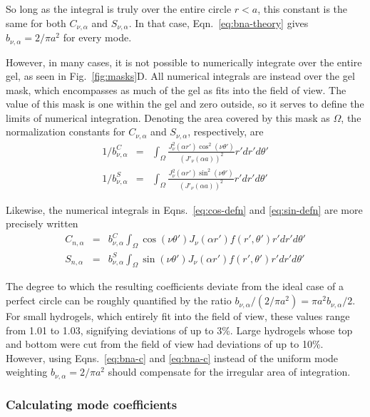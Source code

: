 So long as the integral is truly over the entire circle $r<a$, this constant is the same for both $C_{\nu,\alpha}$ and $S_{\nu,\alpha}$.  In that case, Eqn.~\ref{eq:bna-theory} gives $b_{\nu,\alpha} = 2/\pi a^2$ for every mode.

However, in many cases, it is not possible to numerically integrate over the entire gel, as seen in Fig.~\ref{fig:masks}D.  All numerical integrals are instead over the gel mask, which encompasses as much of the gel as fits into the field of view.  The value of this mask is one within the gel and zero outside, so it serves to define the limits of numerical integration.  Denoting the area covered by this mask as $\Omega$, the normalization constants for $C_{\nu,\alpha}$ and $S_{\nu,\alpha}$, respectively, are
\begin{eqnarray}
1/b_{\nu,\alpha}^C  &= & \int_\Omega \frac{ J_\nu^2(\alpha r')\cos^2(\nu\theta') }{\left(J'_\nu (\alpha a)\right)^2} r' dr' d\theta' \label{eq:bna-c} \\
1/b_{\nu,\alpha}^S  &=  &\int_\Omega \frac{ J_\nu^2(\alpha r')\sin^2(\nu\theta') }{\left(J'_\nu (\alpha a)\right)^2} r' dr' d\theta' \label{eq:bna-s}
\end{eqnarray}

Likewise, the numerical integrals in Eqns.~\ref{eq:cos-defn} and \ref{eq:sin-defn} are more precisely written 
\begin{eqnarray}
C_{n,\alpha} & = &b_{\nu,\alpha}^C \int_\Omega \cos\left(\nu\theta'\right) J_\nu(\alpha r')f(r',\theta') r' dr' d\theta' \label{eq:cos-defn2}\\
S_{n,\alpha} & = & b_{\nu,\alpha}^S\int_\Omega \sin\left(\nu\theta'\right) J_\nu(\alpha r') f(r',\theta') r' dr' d\theta' \label{eq:sin-defn2}
\end{eqnarray}

The degree to which the resulting coefficients deviate from the ideal case of a perfect circle can be roughly quantified by the ratio $b_{\nu,\alpha} /(2/\pi a^2) = \pi a^2 b_{\nu,\alpha} /2$. For small hydrogels, which entirely fit into the field of view, these values range from 1.01 to 1.03, signifying deviations of up to 3\%.  Large hydrogels whose top and bottom were cut from the field of view had deviations of up to 10\%.  However, using Eqns.~\ref{eq:bna-c} and \ref{eq:bna-c} instead of the uniform mode weighting $b_{\nu,\alpha} = 2/\pi a^2$ should compensate for the irregular area of integration.

\subsubsection{Calculating mode coefficients}
\label{sec:calcCoeffs}

